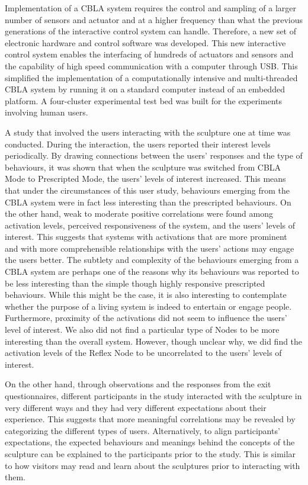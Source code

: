 Implementation of a CBLA system requires the control and sampling of a larger number of sensors and actuator and at a higher frequency than what the previous generations of the interactive control system can handle. Therefore, a new set of electronic hardware and control software was developed. This new interactive control system enables the interfacing of hundreds of actuators and sensors and the capability of high speed communication with a computer through USB. This simplified the implementation of a computationally intensive and multi-threaded CBLA system by running it on a standard computer instead of an embedded platform. A four-cluster experimental test bed was built for the experiments involving human users.

A study that involved the users interacting with the sculpture one at time was conducted. During the interaction, the users reported their interest levels periodically. By drawing connections between the users' responses and the type of behaviours, it was shown that when the sculpture was switched from CBLA Mode to Prescripted Mode, the users' levels of interest increased. This means that under the circumstances of this user study, behaviours emerging from the CBLA system were in fact less interesting than the prescripted behaviours. On the other hand, weak to moderate positive correlations were found among activation levels, perceived responsiveness of the system, and the users' levels of interest. This suggests that systems with activations that are more prominent and with more comprehensible relationships with the users' actions may engage the users better. The subtlety and complexity of the behaviours emerging from a CBLA system are perhaps one of the reasons why its behaviours was reported to be less interesting than the simple though highly responsive prescripted behaviours. While this might be the case, it is also interesting to contemplate whether the purpose of a living system is indeed to entertain or engage people. Furthermore, proximity of the activations did not seem to influence the users' level of interest. We also did not find a particular type of Nodes to be more interesting than the overall system. However, though unclear why, we did find the activation levels of the Reflex Node to be uncorrelated to the users' levels of interest. 

On the other hand, through observations and the responses from the exit questionnaires, different participants in the study interacted with the sculpture in very different ways and they had very different expectations about their experience. This suggests that more meaningful correlations may be revealed by categorizing the different types of users. Alternatively, to align participants' expectations, the expected behaviours and meanings behind the concepts of the sculpture can be explained to the participants prior to the study. This is similar to how visitors may read and learn about the sculptures prior to interacting with them. 
 
